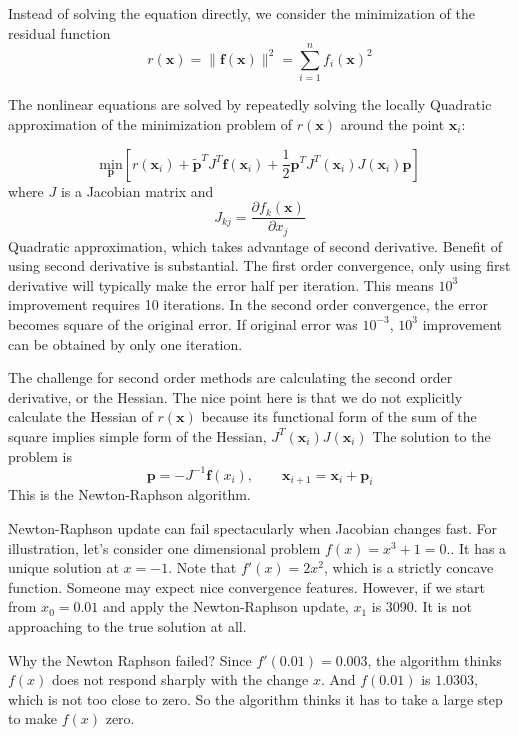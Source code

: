 \documentclass[12pt]{article}
\def\min#1{{\underset{#1}{\mathrm{min}}}}
\def\pdiff#1#2{\frac{\partial #1}{\partial #2}}
\def\xb{{\mathbf{x}}}
\def\fb{{\mathbf{f}}}
\def\pb{{\mathbf{p}}}
\newcommand{\be}{\begin{equation}}
\newcommand{\ee}{\end{equation}}
\begin{document}
Instead of solving the equation directly, we consider the minimization of the residual function
\[
r(\xb) = \|\fb(\xb)\|^2 = \sum_{i=1}^n f_i(\xb)^2
\]

The nonlinear equations are solved by repeatedly solving the locally Quadratic approximation of
the minimization problem of $r(\xb)$ around the point $\xb_i$: 

\be \label{eq:unconditionalQuadratic}
\min{\pb} \left[ r(\xb_i) + \tilde{\pb}^T J^T\fb(\xb_i)  + 
        \frac{1}{2} \pb^T J^T(\xb_i) J(\xb_i)\pb\right] 
\ee
where $J$ is a Jacobian matrix and
\[
J_{kj} =\pdiff{f_k(\xb)}{x_j} 
\]
Quadratic approximation, which takes advantage of second derivative. Benefit of using second derivative is substantial. The first order convergence, only using first derivative will typically make the error half per iteration. This means $10^{3}$ improvement requires 10 iterations. In the second order convergence, the error becomes square of the original error. If original error was $10^{-3}$, $10^{3}$  improvement can be obtained by only one iteration. 

The challenge for second order methods are calculating the second order derivative, or the Hessian. The nice point here is that we do not explicitly calculate the Hessian of $r(\xb)$ because its functional form of the sum of the square implies simple form of the Hessian, $ J^T(\xb_i)
J(\xb_i)$
The solution to the problem is
\[
\pb = - J^{-1}\fb(x_i),\qquad \xb _{i+1} = \xb_i + \pb_i
\]
This is the Newton-Raphson algorithm. 

Newton-Raphson update can fail spectacularly when Jacobian changes fast. For illustration, let's
consider one dimensional problem $f(x) = x^3+1 = 0.$. It has a unique solution at $x = -1 $. Note that $f'(x) = 2 x^2$, which is a strictly concave function. Someone may expect nice convergence features.   However,
if we start from $x_0=0.01$ and apply the Newton-Raphson update, $x_1 $ is 3090. It is not approaching to the true solution at all.

Why the Newton Raphson failed? Since $f'(0.01) = 0.003$, the algorithm thinks $f(x)$ does not
respond sharply with the change $x$. And $f(0.01)$ is $ 1.0303$, which is not too close to zero. So
the algorithm thinks it has to take a large step to make $f(x)$ zero.  
\end{document}
